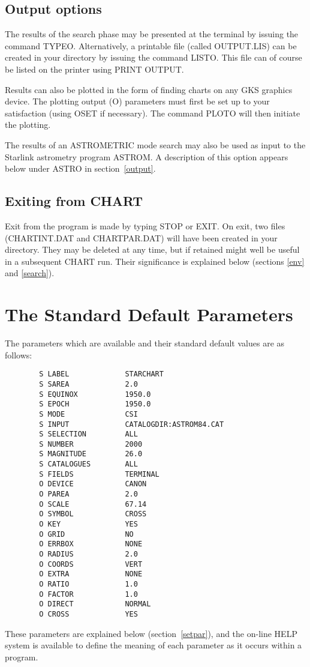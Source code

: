 \documentclass{article}
\begin{document}
\subsection{Output options}
The results of the search phase may be presented at the terminal by issuing the
command TYPEO.
Alternatively, a printable file (called OUTPUT.LIS) can be created in your
directory by issuing the command LISTO.
This file can of course be listed on the printer using PRINT OUTPUT.

Results can also be plotted in the form of finding charts on any GKS graphics
device.
The plotting output (O) parameters must first be set up to your satisfaction
(using OSET if necessary).
The command PLOTO will then initiate the plotting.

The results of an ASTROMETRIC mode search may also be used as input to the
Starlink astrometry program ASTROM.
A description of this option appears below under ASTRO in section~\ref{output}.
\subsection{Exiting from CHART}
Exit from the program is made by typing STOP or EXIT.
On exit, two files (CHARTINT.DAT and CHARTPAR.DAT) will have been created in
your directory.
They may be deleted at any time, but if retained might well be useful in a
subsequent CHART run.
Their significance is explained below (sections \ref{env} and \ref{search}).
\section{The Standard Default Parameters}
\label{defpar}
The parameters which are available and their standard default values are as
follows:
\begin{verbatim}
        S LABEL             STARCHART
        S SAREA             2.0
        S EQUINOX           1950.0
        S EPOCH             1950.0
        S MODE              CSI
        S INPUT             CATALOGDIR:ASTROM84.CAT
        S SELECTION         ALL
        S NUMBER            2000
        S MAGNITUDE         26.0
        S CATALOGUES        ALL
        S FIELDS            TERMINAL
        O DEVICE            CANON
        O PAREA             2.0
        O SCALE             67.14
        O SYMBOL            CROSS
        O KEY               YES
        O GRID              NO
        O ERRBOX            NONE
        O RADIUS            2.0
        O COORDS            VERT
        O EXTRA             NONE
        O RATIO             1.0
        O FACTOR            1.0
        O DIRECT            NORMAL
        O CROSS             YES

\end{verbatim}
These parameters are explained below (section~\ref{setpar}), and the on-line
HELP system is available to define the meaning of each parameter as it occurs
within a program.
\end{document}
